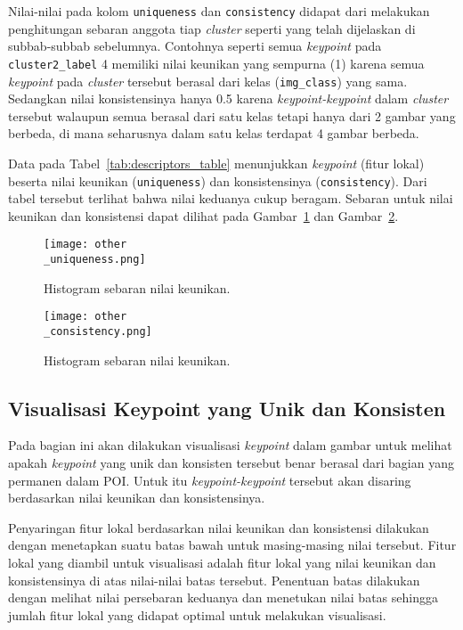 Nilai-nilai pada kolom \texttt{uniqueness} dan \texttt{consistency} didapat dari melakukan penghitungan sebaran anggota tiap \textit{cluster} seperti yang telah dijelaskan di subbab-subbab sebelumnya. Contohnya seperti semua \textit{keypoint} pada \texttt{cluster2\_label} 4 memiliki nilai keunikan yang sempurna (1) karena semua \textit{keypoint} pada \textit{cluster} tersebut berasal dari kelas (\texttt{img\_class}) yang sama. Sedangkan nilai konsistensinya hanya 0.5 karena \textit{keypoint-keypoint} dalam \textit{cluster} tersebut walaupun semua berasal dari satu kelas tetapi hanya dari 2 gambar yang berbeda, di mana seharusnya dalam satu kelas terdapat 4 gambar berbeda.

Data pada Tabel~\ref{tab:descriptors_table} menunjukkan \textit{keypoint} (fitur lokal) beserta nilai keunikan (\texttt{uniqueness}) dan konsistensinya (\texttt{consistency}). Dari tabel tersebut terlihat bahwa nilai keduanya cukup beragam. Sebaran untuk nilai keunikan dan konsistensi dapat dilihat pada Gambar~\ref{fig:hist_other_uniqueness} dan Gambar~\ref{fig:hist_other_consistency}.

\begin{figure}[H]
	\centering
	\texttt{[image: other\\\_uniqueness.png]}
	\caption{Histogram sebaran nilai keunikan.}
	\label{fig:hist_other_uniqueness}
\end{figure}

\begin{figure}[H]
	\centering
	\texttt{[image: other\\\_consistency.png]}
	\caption{Histogram sebaran nilai keunikan.}
	\label{fig:hist_other_consistency}
\end{figure}

\subsection{Visualisasi Keypoint yang Unik dan Konsisten}
Pada bagian ini akan dilakukan visualisasi \textit{keypoint} dalam gambar untuk melihat apakah \textit{keypoint} yang unik dan konsisten tersebut benar berasal dari bagian yang permanen dalam POI. Untuk itu \textit{keypoint-keypoint} tersebut akan disaring berdasarkan nilai keunikan dan konsistensinya. 

Penyaringan fitur lokal berdasarkan nilai keunikan dan konsistensi dilakukan dengan menetapkan suatu batas bawah untuk masing-masing nilai tersebut. Fitur lokal yang diambil untuk visualisasi adalah fitur lokal yang nilai keunikan dan konsistensinya di atas nilai-nilai batas tersebut. Penentuan batas dilakukan dengan melihat nilai persebaran keduanya dan menetukan nilai batas sehingga jumlah fitur lokal yang didapat optimal untuk melakukan visualisasi.


